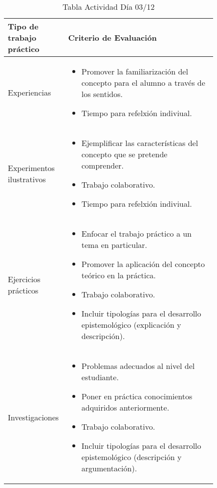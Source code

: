 \documentclass[12pt]{report}
\newcounter{it}
\theoremstyle{largebreak}
\begin{document}
    \begin{table}[ht]
        \centering
        \begin{tabular}{p{0.17\linewidth} | p{0.68\linewidth} }
            Tipo de trabajo práctico & Criterio de Evaluación  \\
            \hline
             Experiencias & \begin{itemize}
                \item Promover la familiarización del concepto para el alumno a través de los sentidos.
                \item Tiempo para refelxión indiviual.
             \end{itemize} \\
             Experimentos ilustrativos & \begin{itemize}
                \item Ejemplificar las características del concepto que se pretende comprender.
                \item Trabajo colaborativo.
                \item Tiempo para refelxión indiviual.
             \end{itemize} \\
             Ejercicios prácticos & \begin{itemize}
                \item Enfocar el trabajo práctico a un tema en particular.
                \item Promover la aplicación del concepto teórico en la práctica.
                \item Trabajo colaborativo.
                \item Incluir tipologías para el desarrollo epistemológico (explicación y descripción).
             \end{itemize} \\
             Investigaciones & \begin{itemize}
                \item Problemas adecuados al nivel del estudiante.
                \item Poner en práctica conocimientos adquiridos anteriormente.
                \item Trabajo colaborativo.
                \item Incluir tipologías para el desarrollo epistemológico (descripción y argumentación).
             \end{itemize} \\
        \end{tabular}
        \caption{Tabla Actividad Día 03/12}
        \label{tab:my_label}
    \end{table}

    
\end{document}
